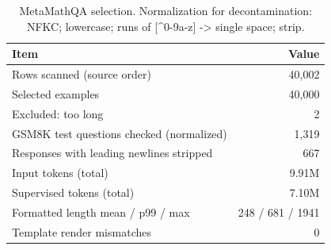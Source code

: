 \begin{table}[t]
\centering
\small
\caption{MetaMathQA selection. Normalization for decontamination: NFKC; lowercase; runs of [\^{}0-9a-z] -> single space; strip.}
\label{tab:t1-data}
\begin{tabular}{lr}
\toprule
Item & Value \\
\midrule
Rows scanned (source order) & 40,002 \\
Selected examples & 40,000 \\
Excluded: too long & 2 \\
GSM8K test questions checked (normalized) & 1,319 \\
Responses with leading newlines stripped & 667 \\
Input tokens (total) & 9.91M \\
Supervised tokens (total) & 7.10M \\
Formatted length mean / p99 / max & 248 / 681 / 1941 \\
Template render mismatches & 0 \\
\bottomrule
\end{tabular}
\end{table}
